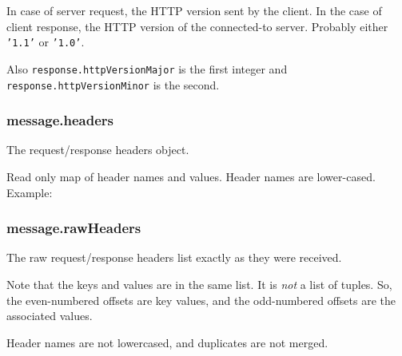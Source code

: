 In case of server request, the HTTP version sent by the client. In the
case of client response, the HTTP version of the connected-to server.
Probably either \texttt{'1.1'} or \texttt{'1.0'}.

Also \texttt{response.httpVersionMajor} is the first integer and
\texttt{response.httpVersionMinor} is the second.

\subsubsection{message.headers}

The request/response headers object.

Read only map of header names and values. Header names are lower-cased.
Example:

\begin{Shaded}
\begin{Highlighting}[]
\CommentTok{//}
\NormalTok{(}\NormalTok{);}
\end{Highlighting}
\end{Shaded}

\subsubsection{message.rawHeaders}

The raw request/response headers list exactly as they were received.

Note that the keys and values are in the same list. It is \emph{not} a
list of tuples. So, the even-numbered offsets are key values, and the
odd-numbered offsets are the associated values.

Header names are not lowercased, and duplicates are not merged.

\begin{Shaded}
\begin{Highlighting}[]
\CommentTok{//}
\CommentTok{// [ 'user-agent',}
\CommentTok{//   '*/*' ]}
\NormalTok{(}\NormalTok{);}
\end{Highlighting}
\end{Shaded}

